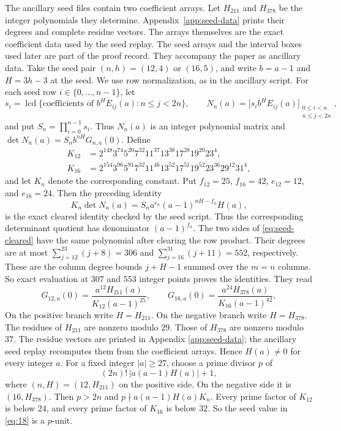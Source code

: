 The ancillary seed files contain two coefficient arrays. Let $H_{211}$ and
$H_{378}$ be the integer polynomials they determine.
Appendix~\ref{app:seed-data} prints their degrees and complete residue
vectors. The arrays themselves are the exact coefficient data used by the
seed replay. The seed arrays and the interval boxes used later are part of
the proof record. They accompany the paper as ancillary data. Take the seed
pair $(n,h)=(12,4)$ or $(16,5)$, and write $b=a-1$ and $H=3h-3$ at the seed.
We use row normalization, as in the ancillary script. For each seed row
$i\in\{0,\ldots,n-1\}$, let
\[
 s_i=\operatorname{lcd}\{\text{coefficients of }b^H E_{ij}(a):
                         n\le j<2n\},
 \qquad
 N_n(a)=\bigl[s_i b^H E_{ij}(a)\bigr]_{\substack{0\le i<n\\ n\le j<2n}},
\]
and put $S_n=\prod_{i=0}^{n-1}s_i$. Thus $N_n(a)$ is an integer polynomial
matrix and $\det N_n(a)=S_n b^{nH}G_{n,a}(0)$.
Define
\[
\begin{aligned}
K_{12}&=2^{148}3^{74}5^{20}7^{32}11^{37}13^{38}17^{28}
        19^{20}23^4,\\
K_{16}&=2^{154}3^{96}5^{91}7^{32}11^{46}13^{52}17^{51}
        19^{52}23^{36}29^{12}31^4,
\end{aligned}
\]
and let $K_n$ denote the corresponding constant. Put
$f_{12}=25$, $f_{16}=42$, $e_{12}=12$, and $e_{16}=24$. Then the preceding
identity
\begin{equation}
 K_n\det N_n(a)=S_n a^{e_n}(a-1)^{nH-f_n}H(a),
\label{eq:seed-cleared}
\end{equation}
is the exact cleared identity checked by the seed script. Thus the
corresponding determinant quotient has denominator $(a-1)^{f_n}$. The two
sides of \eqref{eq:seed-cleared} have the same polynomial after clearing the
row product. Their
degrees are at most
$\sum_{j=12}^{23}(j+8)=306$ and
$\sum_{j=16}^{31}(j+11)=552$, respectively. These are the column degree
bounds $j+H-1$ summed over the $m=n$ columns. So exact evaluation at
$307$ and $553$ integer points proves the identities. They read
\begin{equation}
 G_{12,a}(0)=\frac{a^{12}H_{211}(a)}
 {K_{12}(a-1)^{25}},\qquad
 G_{16,a}(0)=\frac{a^{24}H_{378}(a)}
 {K_{16}(a-1)^{42}},                                    \label{eq:18}
\end{equation}
On the positive branch write $H=H_{211}$. On the negative branch write
$H=H_{378}$. The residues of $H_{211}$ are nonzero modulo $29$. Those of $H_{378}$ are
nonzero modulo $37$. The residue vectors are printed in Appendix
\ref{app:seed-data}; the ancillary seed replay recomputes them from the
coefficient arrays. Hence
$H(a)\ne0$ for every integer $a$.
For a fixed integer $|a|\ge27$, choose a prime divisor $p$ of
\begin{equation}
 (2n)!\,|a(a-1)H(a)|+1,                                  \label{eq:19}
\end{equation}
where $(n,H)=(12,H_{211})$ on the positive side. On the negative side it
is $(16,H_{378})$. Then $p>2n$ and $p\nmid a(a-1)H(a)K_n$. Every prime
factor of $K_{12}$ is below $24$, and every prime factor of $K_{16}$ is
below $32$. So the seed value in \eqref{eq:18} is a $p$-unit.

